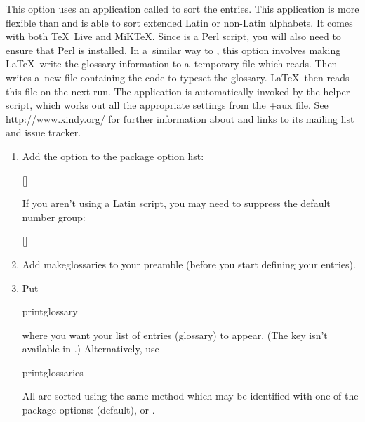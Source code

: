 \documentclass[titlepage=false,oneside,
 fontsize=12pt,captions=tableheading]{scrarticle}
\newcommand{\idxoptiondef}[1]{\hypertarget{option\glsentrytext{idx.opt.#1}}{}\inlineidxdef{opt.#1}}
\begin{document}
\begin{deflist}
\itemtitle{\idxoptiondef{xdy}}

\begin{itemdesc}
   This option uses an application called
    to sort the entries. This application is more
   flexible than  and is able to sort extended
   Latin or non-Latin alphabets. It comes with both \TeX~Live and 
   MiK\TeX. Since  is a Perl script, you will also 
   need to ensure that Perl is installed. In a~similar way to , this 
   option involves making \LaTeX\ write the glossary information to 
   a~temporary file which  reads. Then  
   writes a~new file containing the code to typeset the glossary. 
   \LaTeX\ then reads this file on the next run. The 
   application is automatically invoked by the helper
    script, which works out all the
   appropriate settings from the \ext+{aux} file.
   See \url{http://www.xindy.org/} for further information about
    and links to its mailing list and issue tracker.

   \begin{enumerate}
     \item Add the  option to the 
package option list:
\begin{compactcodebox}
[]
\end{compactcodebox}%
If you aren't using a Latin script, you may need to suppress the
default number group:
\begin{compactcodebox}
[]
\end{compactcodebox}

     \item Add \gls{makeglossaries} to your preamble (before you start
     defining your entries).

    \item Put
\begin{compactcodebox*}
\gls{printglossary}
\end{compactcodebox*}%
    where you want your list of entries (glossary) to appear. (The
     key isn't available in .)
    Alternatively, use
\begin{compactcodebox*}
\gls{printglossaries}
\end{compactcodebox*}

\begin{important}
All  are sorted using the same method
which may be identified with one of the package options:
 (default), 
or .
\end{important}


\end{enumerate}
\end{itemdesc}
\end{deflist}
\end{document}
